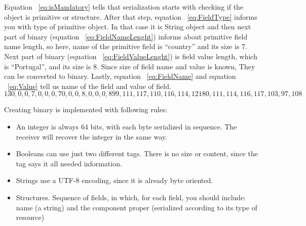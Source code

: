 Equation ~\ref{eq:isMandatory} tells that serialization starts with checking if the object is primitive or structure. After that step, equation ~\ref{eq:FieldType} informs you with type of primitive object. In that case it is String object and then next part of binary (equation ~\ref{eq:FieldNameLenght}) informs about primitive field name length, so here, name of the primitive field is “country” and its size is 7. Next part of binary (equation ~\ref{eq:FieldValueLenght}) is field value length, which is “Portugal”, and its size is 8. Since size of field name and value is known, They can be converted to binary. Lastly, equation ~\ref{eq:FieldName} and equation ~\ref{eq:Value} tell us name of the field and value of field.
\begin{subequations}
    \begin{equation}
    1
    \label{eq:isMandatory}
    \end{equation}
    \begin{equation}
    3
    \label{eq:FieldType}
    \end{equation}
    \begin{equation}
    0, 0, 0, 7, 0, 0, 0, 7
    \label{eq:FieldNameLenght}
    \end{equation}
    \begin{equation}
    0, 0, 0, 8, 0, 0, 0, 8
    \label{eq:FieldValueLenght}
    \end{equation}
    \begin{equation}
    99, 111, 117, 110, 116, 114, 121
    \label{eq:FieldName}
    \end{equation}
    \begin{equation}
    80, 111, 114, 116, 117, 103, 97, 108
    \label{eq:Value}
    \end{equation}
\label{eq:NavierStokes}%
\end{subequations}

Creating binary is implemented with following rules:

\begin{itemize}
\item 	An integer is always 64 bits, with each byte serialized in sequence. The receiver will recover the integer in the same way.
\item 	Booleans can use just two different tags. There is no size or content, since the tag says it all needed information.
\item 	Strings use a UTF-8 encoding, since it is already byte oriented.
\item 	Structures. Sequence of fields, in which, for each field, you should include: name (a string) and the component proper (serialized according to its type of resource)
\end{itemize}

